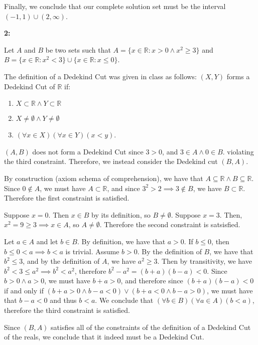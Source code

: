 \documentclass{article}
\newcommand{\reals}{\mathbb{R}}
\begin{document}
Finally, we conclude that our complete solution set
must be the interval $(-1,1) \cup (2, \infty)$.

\medskip
\textbf{2:}

Let $A$ and $B$ be two sets such that
$A = \{x \in \reals: x > 0 \land x^2 \geq 3\}$
and $B = \{x \in \reals: x^2 < 3\} \cup \{x \in \reals: x \le 0\}$.

The definition of a Dedekind Cut was given in class as follows:
$(X,Y)$ forms a Dedekind Cut of $\reals$ if:
\begin{enumerate}
	\item
	$X \subset \reals \land Y \subset \reals$
	\item
	$X \neq \emptyset \land Y \neq \emptyset$
	\item
	$(\forall x \in X)(\forall x \in Y)(x < y)$.
\end{enumerate}

\medskip
$(A,B)$ does not form a Dedekind Cut since $3 > 0$, and $3 \in A \land 0 \in B$.
violating the third constraint. Therefore, we instead consider the Dedekind cut $(B,A)$.

By construction (axiom schema of comprehension), we have that $A \subseteq \reals \land B \subseteq \reals$.
Since $0 \not\in A$, we must have $A \subset \reals$,
and since $3^2 > 2 \implies 3 \not\in B$, we have $B \subset \reals$.
Therefore the first constraint is satisfied.

Suppose $x = 0$. Then $x \in B$ by its definition, so $B \neq \emptyset$.
Suppose $x = 3$. Then, $x^2 = 9  \geq 3 \implies x \in A$, so $A \neq \emptyset$.
Therefore the second constraint is satsisfied.

Let $a \in A$ and let $b \in B$.
By definition, we have that $a > 0$.
If $b \leq 0$, then $b \leq 0 < a \implies b < a$ is trivial.
Assume $b > 0$. By the definition of $B$, we have that $b^2 \leq 3$,
and by the definition of $A$, we have $a^2 \geq 3$.
Then by transitivity, we have $b^2 < 3 \le a^2 \implies b^2 < a^2$,
therefore $b^2 - a^2 = (b+a)(b-a) < 0$.
Since $b > 0 \land a > 0$, we must have $b + a > 0$,
and therefore since $(b+a)(b-a) < 0$ if and only if
$(b+a > 0 \land b-a < 0) \lor (b + a < 0 \land b - a > 0)$,
we must have that $b-a < 0$ and thus $b < a$.
We conclude that $(\forall b \in B)(\forall a \in A)(b < a)$,
therefore the third constraint is satisfied.

Since $(B,A)$ satisfies all of the constraints of the definition
of a Dedekind Cut of the reals, we conclude that it indeed must be a Dedekind Cut.
\end{document}
